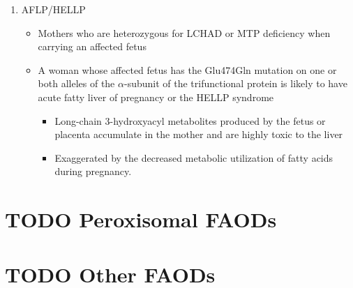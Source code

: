 \documentclass{scrartcl}
\begin{document}
\begin{enumerate}
\item AFLP/HELLP
\label{sec:org302529d}
\begin{itemize}
\item Mothers who are heterozygous for LCHAD or MTP deficiency when
carrying an affected fetus
\item A woman whose affected fetus has the Glu474Gln mutation on one or
both alleles of the \(\alpha\)-subunit of the trifunctional protein is
likely to have acute fatty liver of pregnancy or the HELLP syndrome 
\begin{itemize}
\item Long-chain 3-hydroxyacyl metabolites produced by the fetus or
placenta accumulate in the mother and are highly toxic to the liver
\item Exaggerated by the decreased metabolic utilization of fatty acids
during pregnancy.
\end{itemize}
\end{itemize}
\end{enumerate}

\section{{\bfseries\sffamily TODO} Peroxisomal FAODs}
\label{sec:org108bfc4}
\section{{\bfseries\sffamily TODO} Other FAODs}
\label{sec:orgee12fc5}
\end{document}
